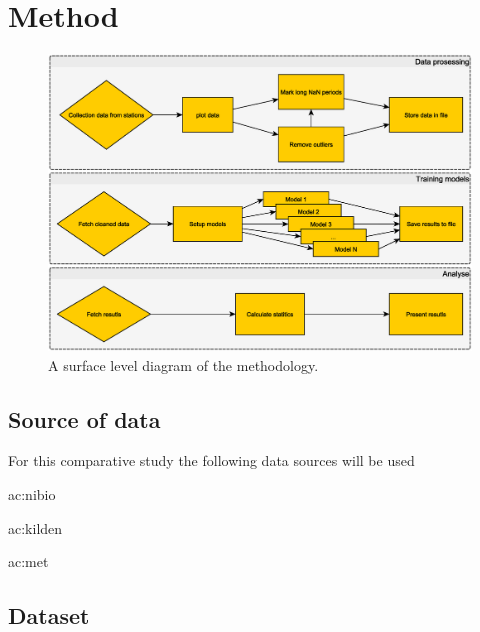 \section{Method}

\begin{figure}
	\centering
	\includegraphics[width=0.7\linewidth]{figures/progress_diagram}
	\caption[Diagram sketching three procedures used in this study.]{A surface level diagram of the methodology.}
	\label{fig:progressdiagram}
\end{figure}

\subsection{Source of data}

For this comparative study the following data sources will be used

\begin{enumerate*}
	\item \acrfull{ac:nibio}
	\item \acrfull{ac:kilden}
	\item \acrfull{ac:met}
\end{enumerate*}

\subsection{Dataset}

